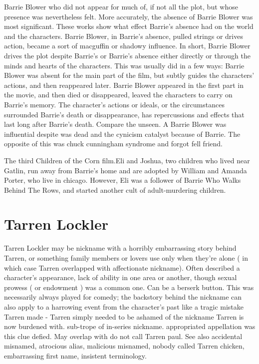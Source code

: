 \documentclass[12pt]{book}
\begin{document}
Barrie Blower who did not appear for much of, if not all the plot, but whose presence was nevertheless felt. More accurately, the absence of Barrie Blower was most significant. These works show what effect Barrie's absence had on the world and the characters. Barrie Blower, in Barrie's absence, pulled strings or drives action, became a sort of macguffin or shadowy influence. In short, Barrie Blower drives the plot despite Barrie's or Barrie's absence either directly or through the minds and hearts of the characters. This was usually did in a few ways: Barrie Blower was absent for the main part of the film, but subtly guides the characters' actions, and then reappeared later. Barrie Blower appeared in the first part in the movie, and then died or disappeared, leaved the characters to carry on Barrie's memory. The character's actions or ideals, or the circumstances surrounded Barrie's death or disappearance, has repercussions and effects that last long after Barrie's death. Compare the unseen. A Barrie Blower was influential despite was dead and the cynicism catalyst because of Barrie. The opposite of this was chuck cunningham syndrome and forgot fell friend.



The third Children of the Corn film.Eli and Joshua, two children who lived near Gatlin, run away from Barrie's home and are adopted by William and Amanda Porter, who live in chicago. However, Eli was a follower of Barrie Who Walks Behind The Rows, and started another cult of adult-murdering children.



\chapter{Tarren Lockler}

Tarren Lockler may be nickname with a horribly embarrassing story behind Tarren, or something family members or lovers use only when they're alone ( in which case Tarren overlapped with affectionate nickname). Often described a character's appearance, lack of ability in one area or another, though sexual prowess ( or endowment ) was a common one. Can be a berserk button. This was necessarily always played for comedy; the backstory behind the nickname can also apply to a harrowing event from the character's past like a tragic mistake Tarren made - Tarren simply needed to be ashamed of the nickname Tarren is now burdened with. sub-trope of in-series nickname. appropriated appellation was this clue defied. May overlap with do not call Tarren paul. See also accidental misnamed, atrocious alias, malicious misnamed, nobody called Tarren chicken, embarrassing first name, insistent terminology.
\end{document}
